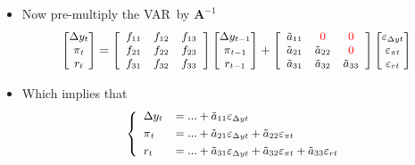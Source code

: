 \documentclass[10pt,handout]{beamer}
\begin{document}
\begin{frame}
\begin{itemize}
\item Now pre-multiply the VAR\ by $\mathbf{A}^{-1}$%
\begin{equation*}
{\small 
\begin{bmatrix}
\Delta y_{t} \\ 
\pi _{t} \\ 
r_{t}%
\end{bmatrix}%
=\left[ 
\begin{array}{ccc}
f_{11} & f_{12} & f_{13} \\ 
f_{21} & f_{22} & f_{23} \\ 
f_{31} & f_{32} & f_{33}%
\end{array}%
\right] 
\begin{bmatrix}
\Delta y_{t-1} \\ 
\pi _{t-1} \\ 
r_{t-1}%
\end{bmatrix}%
+\left[ 
\begin{array}{ccc}
\tilde{a}_{11} & {%
\color{red}%
{0}} & {%
\color{red}%
{0}} \\ 
\tilde{a}_{21} & \tilde{a}_{22} & {%
\color{red}%
{0}} \\ 
\tilde{a}_{31} & \tilde{a}_{32} & \tilde{a}_{33}%
\end{array}%
\right] 
\begin{bmatrix}
\varepsilon _{\Delta yt} \\ 
\varepsilon _{\pi t} \\ 
\varepsilon _{rt}%
\end{bmatrix}%
}
\end{equation*}

\item Which implies that 
\begin{equation*}
{\small \left\{ 
\begin{array}{ll}
\Delta y_{t} & =...+\tilde{a}_{11}\varepsilon _{\Delta yt}\smallskip \\ 
\pi _{t} & =...+\tilde{a}_{21}\varepsilon _{\Delta yt}+\tilde{a}%
_{22}\varepsilon _{\pi t}\smallskip \\ 
r_{t} & =...+\tilde{a}_{31}\varepsilon _{\Delta yt}+\tilde{a}%
_{32}\varepsilon _{\pi t}+\tilde{a}_{33}\varepsilon _{rt}%
\end{array}%
\right.}
\end{equation*}
\end{itemize}
\end{frame}
\end{document}
